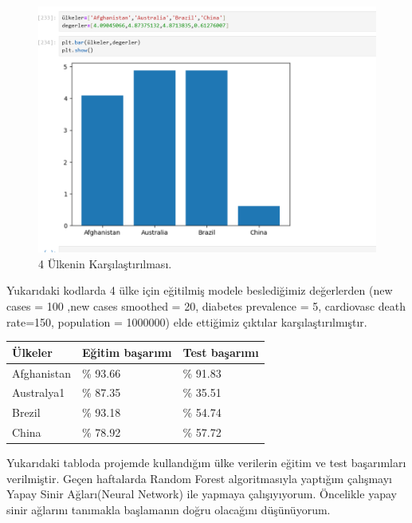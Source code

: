 \documentclass[12pt, a4paper]{article}
\begin{document}
	\begin{figure}[!htbp] 
		
		\centering
		\includegraphics[angle=0, width=\textwidth]{14.png}
		\caption{4 Ülkenin Karşılaştırılması.}
	\end{figure}
	Yukarıdaki kodlarda 4 ülke için eğitilmiş modele beslediğimiz değerlerden (new cases = 100 ,new cases smoothed = 20, diabetes prevalence = 5, cardiovasc death rate=150, population = 1000000) elde ettiğimiz çıktılar karşılaştırılmıştır.
	\newline
	\begin{centering}
		
		\begin{tabular}{lll}
			\hline
			Ülkeler  & Eğitim başarımı & Test başarımı \\ \hline
			Afghanistan & \% 93.66 & \% 91.83 \\
			Australya1 & \% 87.35 & \% 35.51 \\
			Brezil & \% 93.18 & \% 54.74 \\
			China & \% 78.92 & \% 57.72 \\
			\hline
		\end{tabular}
	\end{centering}
	\newline Yukarıdaki tabloda projemde kullandığım ülke verilerin eğitim ve test başarımları verilmiştir.
	Geçen haftalarda Random Forest algoritmasıyla yaptığım çalışmayı Yapay Sinir Ağları(Neural Network) ile yapmaya çalışıyıyorum. Öncelikle yapay sinir ağlarını tanımakla başlamanın doğru olacağını düşünüyorum.
	\newline
\end{document}
